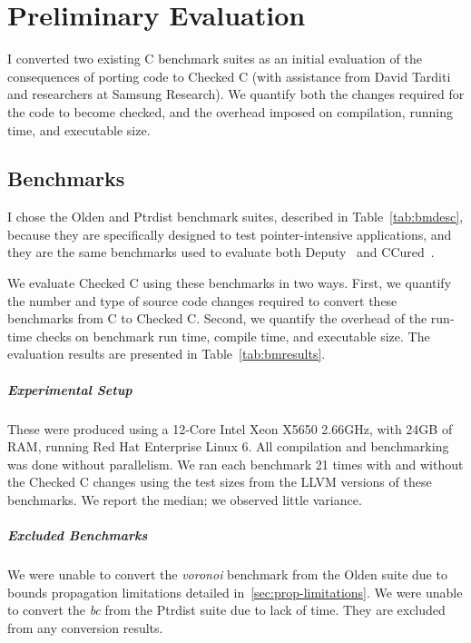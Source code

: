 \chapter{Preliminary Evaluation}
\label{sec:evaluation}

I converted two existing C benchmark suites as an initial evaluation
of the consequences of porting code to Checked C (with assistance from
David Tarditi and researchers at Samsung Research). We quantify both
the changes required for the code to become checked, and the overhead
imposed on compilation, running time, and executable size.

\section{Benchmarks}

\begin{table}[ht]

\end{table}

I chose the Olden \cite{Rogers1995Olden} and Ptrdist
\cite{Austin1994Ptrdist} benchmark suites, described in
Table~\ref{tab:bmdesc}, because they are specifically designed to test
pointer-intensive applications, and they are the same benchmarks used
to evaluate both Deputy~\cite{Feng2006} and CCured~\cite{Necula2005}.

We evaluate Checked C using these benchmarks in two ways. First, we
quantify the number and type of source code changes required to
convert these benchmarks from C to Checked C. Second, we quantify the
overhead of the run-time checks on benchmark run time, compile time,
and executable size. The evaluation results are presented in
Table~\ref{tab:bmresults}.

\paragraph{Experimental Setup} These were produced using a 12-Core
Intel Xeon X5650 2.66GHz, with 24GB of RAM, running Red Hat Enterprise
Linux 6. All compilation and benchmarking was done without
parallelism. We ran each benchmark 21 times with and without the
Checked C changes using the test sizes from the LLVM versions of these
benchmarks. We report the median; we observed little variance.

\paragraph{Excluded Benchmarks} We were unable to convert the
\emph{voronoi} benchmark from the Olden suite due to bounds
propagation limitations detailed in~\autoref{sec:prop-limitations}. We
were unable to convert the \emph{bc} from the Ptrdist suite due to
lack of time. They are excluded from any conversion results.

